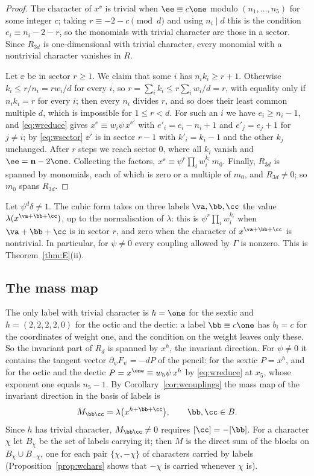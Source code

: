 \begin{proof}
The character of $x^{\ee}$ is trivial when $\ee\equiv c\one$ modulo
$(n_1,\dots,n_5)$ for some integer $c$; taking $r\equiv-2-c\pmod d$ and
using $n_i\mid d$ this is the condition $e_i\equiv n_i-2-r$, so the
monomials with trivial character are those in a sector. Since $R_{3d}$ is
one-dimensional with trivial character, every monomial with a nontrivial
character vanishes in $R$.

Let $\ee$ be in sector $r\ge1$. We claim that some $i$ has $n_ik_i\ge
r+1$. Otherwise $k_i\le r/n_i=rw_i/d$ for every $i$, so $r=\sum_ik_i\le
r\sum_iw_i/d=r$, with equality only if $n_ik_i=r$ for every $i$; then every
$n_i$ divides $r$, and so does their least common multiple $d$, which is
impossible for $1\le r<d$. For such an $i$ we have $e_i\ge n_i-1$, and
\eqref{eq:wreduce} gives $x^{\ee}\equiv w_i\psi\,x^{\ee'}$ with
$e'_i=e_i-n_i+1$ and $e'_j=e_j+1$ for $j\ne i$; by \eqref{eq:wsector}
$\ee'$ is in sector $r-1$ with $k'_i=k_i-1$ and the other $k_j$ unchanged.
After $r$ steps we reach sector $0$, where all $k_i$ vanish and
$\ee=\mathbf n-2\one$. Collecting the factors,
$x^{\ee}\equiv\psi^r\prod_iw_i^{k_i}\,m_0$. Finally, $R_{3d}$ is spanned
by monomials, each of which is zero or a multiple of $m_0$, and
$R_{3d}\ne0$; so $m_0$ spans $R_{3d}$.
\end{proof}

\begin{corollary}\label{cor:wcouplings}
Let $\psi^d\delta\ne1$. The cubic form takes on three labels
$\va,\bb,\cc$ the value $\lambda(x^{\va+\bb+\cc})$, up to the normalisation
of $\lambda$: this is $\psi^r\prod_iw_i^{k_i}$ when $\va+\bb+\cc$ is in
sector $r$, and zero when the character of $x^{\va+\bb+\cc}$ is
nontrivial. In particular, for $\psi\ne0$ every coupling allowed by
$\Gamma$ is nonzero. This is Theorem~\ref{thm:E}(ii).
\end{corollary}

\subsection{The mass map}

The only label with trivial character is $h=\one$ for the sextic and
$h=(2,2,2,2,0)$ for the octic and the dectic: a label $\bb\equiv c\one$ has
$b_i=c$ for the coordinates of weight one, and the condition on the weight
leaves only these. So the invariant part of $R_d$ is spanned by $x^h$,
the invariant direction. For $\psi\ne0$ it contains the tangent vector
$\partial_\psi F_\psi=-dP$ of the pencil: for the sextic $P=x^h$, and for
the octic and the dectic $P=x^{\one}\equiv w_5\psi\,x^h$ by
\eqref{eq:wreduce} at $x_5$, whose exponent one equals $n_5-1$. By
Corollary~\ref{cor:wcouplings} the mass map of the invariant direction in
the basis of labels is
\[
M_{\bb\cc}=\lambda\big(x^{h+\bb+\cc}\big),\qquad \bb,\cc\in B .
\]
Since $h$ has trivial character, $M_{\bb\cc}\ne0$ requires
$[\cc]=-[\bb]$. For a character $\chi$ let $B_\chi$ be the set of labels
carrying it; then $M$ is the direct sum of the blocks on
$B_\chi\cup B_{-\chi}$, one for each pair $\{\chi,-\chi\}$ of characters
carried by labels (Proposition~\ref{prop:wchars} shows that $-\chi$ is
carried whenever $\chi$ is).

